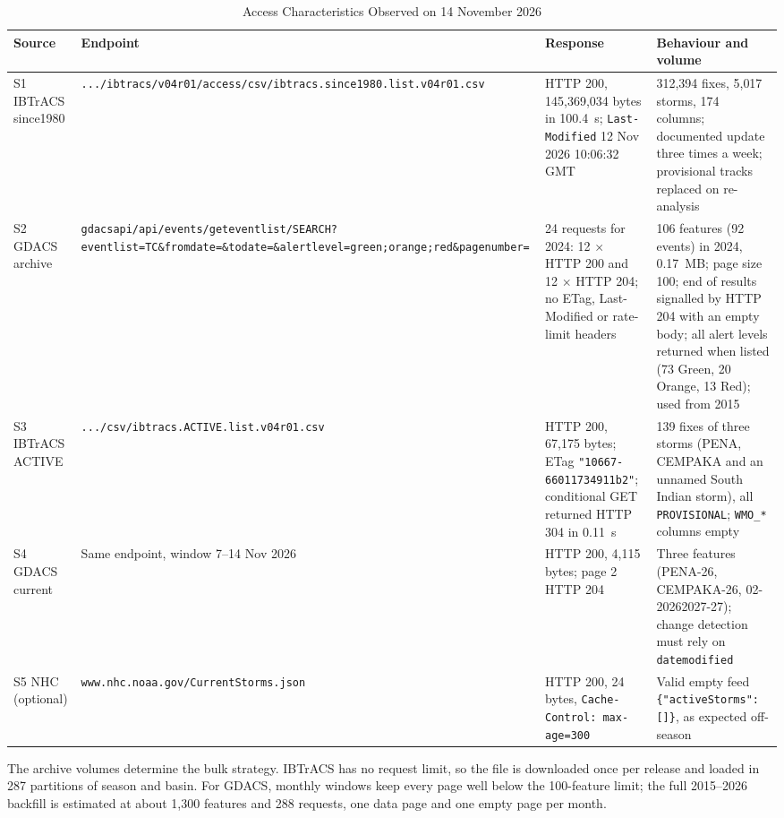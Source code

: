 \documentclass[10pt,twocolumn,letterpaper]{article}
\newcommand{\code}[1]{\texttt{\footnotesize #1}}
\begin{document}
\begin{table}[t]
\caption{Access Characteristics Observed on 14 November 2026}\label{tab:access}
\centering\footnotesize
\begin{tabularx}{\textwidth}{@{}L{2.1cm}L{4.6cm}L{3.4cm}Y@{}}
\toprule
Source & Endpoint & Response & Behaviour and volume\\
\midrule
S1 IBTrACS since1980 & {\scriptsize\nolinkurl{.../ibtracs/v04r01/access/csv/ibtracs.since1980.list.v04r01.csv}} & HTTP 200, 145{,}369{,}034 bytes in 100.4~s; \code{Last-Modified} 12 Nov 2026 10:06:32 GMT & 312{,}394 fixes, 5{,}017 storms, 174 columns; documented update three times a week; provisional tracks replaced on re-analysis \cite{ibtracs-data}\\
S2 GDACS archive & {\scriptsize\nolinkurl{gdacsapi/api/events/geteventlist/SEARCH?eventlist=TC&fromdate=&todate=&alertlevel=green;orange;red&pagenumber=}} & 24 requests for 2024: 12 $\times$ HTTP 200 and 12 $\times$ HTTP 204; no ETag, Last-Modified or rate-limit headers & 106 features (92 events) in 2024, 0.17~MB; page size 100; end of results signalled by HTTP 204 with an empty body; all alert levels returned when listed (73 Green, 20 Orange, 13 Red); used from 2015\\
S3 IBTrACS ACTIVE & {\scriptsize\nolinkurl{.../csv/ibtracs.ACTIVE.list.v04r01.csv}} & HTTP 200, 67{,}175 bytes; ETag {\scriptsize\texttt{"10667-\allowbreak 66011734911b2"}}; conditional GET returned HTTP 304 in 0.11~s & 139 fixes of three storms (PENA, CEMPAKA and an unnamed South Indian storm), all \code{PROVISIONAL}; \code{WMO\_*} columns empty\\
S4 GDACS current & Same endpoint, window 7--14 Nov 2026 & HTTP 200, 4{,}115 bytes; page 2 HTTP 204 & Three features (PENA-26, CEMPAKA-26, 02-20262027-27); change detection must rely on \code{datemodified}\\
S5 NHC (optional) & {\scriptsize\nolinkurl{www.nhc.noaa.gov/CurrentStorms.json}} & HTTP 200, 24 bytes, \code{Cache-Control: max-age=300} & Valid empty feed \code{\{"activeStorms": []\}}, as expected off-season\\
\bottomrule
\end{tabularx}
\end{table}

The archive volumes determine the bulk strategy. IBTrACS has no request limit, so the file is downloaded once per release and loaded in 287 partitions of season and basin. For GDACS, monthly windows keep every page well below the 100-feature limit; the full 2015--2026 backfill is estimated at about 1{,}300 features and 288 requests, one data page and one empty page per month.
\end{document}
